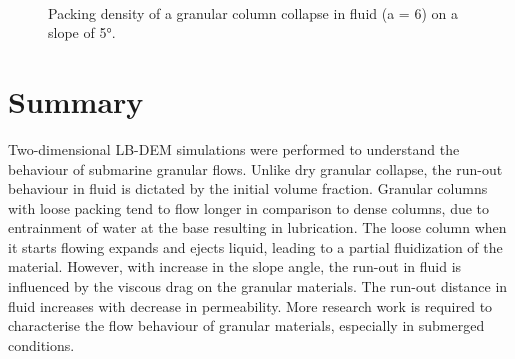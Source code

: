 \begin{figure}
\\
\caption{Packing density of a granular column collapse in fluid (a = 6) on a 
slope of 5\si{\degree}.}
\label{fig:a6_slope_voro}
\end{figure}

\section{Summary}

Two-dimensional LB-DEM simulations were performed to understand the behaviour 
of submarine granular flows. Unlike dry granular collapse, the run-out 
behaviour in fluid is dictated by the initial volume fraction. Granular columns 
with loose packing tend to flow longer in comparison to dense columns, due to 
entrainment of water at the base resulting in lubrication. The loose column 
when it starts flowing expands and ejects liquid, leading to a partial 
fluidization of the material. However, with increase in the slope angle, the 
run-out in fluid is influenced by the viscous drag on the granular materials. 
The run-out distance in fluid increases with decrease in permeability. More 
research work is required to characterise the flow behaviour of granular 
materials, especially in submerged conditions.
